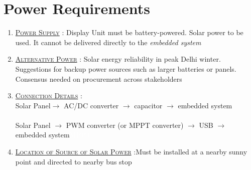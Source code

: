 \section{Power Requirements}

\begin{enumerate}
    \item {}\underline{\textsc{Power Supply}} : Display Unit must be battery-powered. Solar power to be used. It cannot be delivered directly to the \textit{\gls{embedded system}}

    \item \underline{\textsc{Alternative Power}} : Solar energy reliability in peak Delhi winter. Suggestions for backup power sources such as larger batteries or panels. Consensus needed on procurement across stakeholders

    \item \underline{\textsc{Connection Details}} : \\Solar Panel$\to$ AC/\ac{DC} converter $\to$ capacitor $\to$ \gls{embedded system} \\ \\
          Solar Panel $\to$ \gls{PWM converter} (or \gls{MPPT converter}) $\to$ \gls{USB} $\to$ \Gls{embedded system}{\tiny \textcolor{white}{\ac{MPPT}}}

    \item \underline{\textsc{Location of Source of Solar Power}} :Must be installed at a nearby sunny point and directed to nearby bus stop
\end{enumerate}